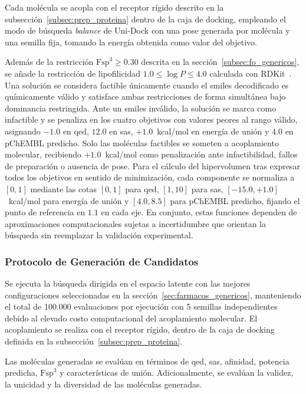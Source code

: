 Cada molécula se acopla con el receptor rígido descrito en la subsección~\ref{subsec:prep_proteina} dentro de la caja de docking, empleando el modo de búsqueda \textit{balance} de Uni-Dock con una pose generada por molécula y una semilla fija, tomando la energía obtenida como valor del objetivo.

Además de la restricción $\text{Fsp}^3 \ge 0.30$ descrita en la sección~\ref{subsec:fo_genericos}, se añade la restricción de lipofilicidad $1.0 \le \log P \le 4.0$ calculada con RDKit~\cite{landrum2026rdkit}. Una solución se considera factible únicamente cuando el \gls{smiles} decodificado es químicamente válido y satisface ambas restricciones de forma simultánea bajo dominancia restringida. Ante un \gls{smiles} inválido, la solución se marca como infactible y se penaliza en los cuatro objetivos con valores peores al rango válido, asignando $-1.0$ en \gls{qed}, $12.0$ en \gls{sas}, $+1.0$~kcal/mol en energía de unión y $4.0$ en pChEMBL predicho. Solo las moléculas factibles se someten a acoplamiento molecular, recibiendo $+1.0$~kcal/mol como penalización ante infactibilidad, fallos de preparación o ausencia de pose. Para el cálculo del hipervolumen tras expresar todos los objetivos en sentido de minimización, cada componente se normaliza a $[0, 1]$ mediante las cotas $[0, 1]$ para \gls{qed}, $[1, 10]$ para \gls{sas}, $[-15.0, +1.0]$~kcal/mol para energía de unión y $[4.0, 8.5]$ para pChEMBL predicho, fijando el punto de referencia en $1.1$ en cada eje. En conjunto, estas funciones dependen de aproximaciones computacionales sujetas a incertidumbre que orientan la búsqueda sin reemplazar la validación experimental.

\subsubsection{Protocolo de Generación de Candidatos}
\label{subsec:protocolo_mrp1}

Se ejecuta la búsqueda dirigida en el espacio latente con las mejores configuraciones seleccionadas en la sección~\ref{sec:farmacos_genericos}, manteniendo el total de 100.000 evaluaciones por ejecución con 5 semillas independientes debido al elevado costo computacional del acoplamiento molecular. El acoplamiento se realiza con el receptor rígido, dentro de la caja de docking definida en la subsección~\ref{subsec:prep_proteina}.

Las moléculas generadas se evalúan en términos de \gls{qed}, \gls{sas}, afinidad, potencia predicha, $\text{Fsp}^3$ y características de unión. Adicionalmente, se evalúan la validez, la unicidad y la diversidad de las moléculas generadas.

